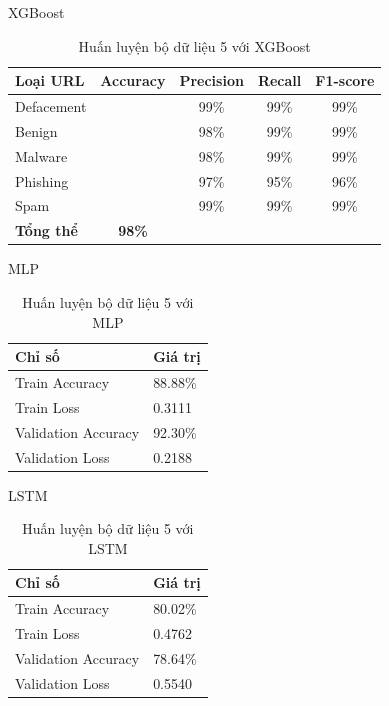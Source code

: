 \documentclass[13pt]{article}
\begin{document}
XGBoost
\newpage
\begin{table}[h]
    \centering
    \renewcommand{\arraystretch}{1.3} %
    \begin{tabular}{|l|c|c|c|c|}
        \hline
        \rowcolor[HTML]{C0C0C0} %
        \textbf{Loại URL} & \textbf{Accuracy} & \textbf{Precision} & \textbf{Recall} & \textbf{F1-score} \\ 
        \hline
        Defacement &  & 99\% & 99\% & 99\% \\ 
        \hline
        Benign &  & 98\% & 99\% & 99\% \\ 
        \hline
        Malware &  & 98\% & 99\% & 99\% \\ 
        \hline
        Phishing &  & 97\% & 95\% & 96\% \\ 
        \hline
        Spam &  & 99\% & 99\% & 99\% \\ 
        \hline
        \textbf{Tổng thể} & \textbf{98\%} &  &  &  \\ 
        \hline
    \end{tabular}
    \caption{Huấn luyện bộ dữ liệu 5 với XGBoost}
    \label{tab:logistic_regression}
\end{table}

MLP
\begin{table}[h]
    \centering
    \renewcommand{\arraystretch}{1.4} %
    \begin{tabular}{|p{5cm}|p{3cm}|}
        \hline
        \rowcolor[HTML]{C0C0C0} %
        \textbf{Chỉ số} & \textbf{Giá trị} \\ 
        \hline
        Train Accuracy & 88.88\% \\ 
        \hline
        Train Loss & 0.3111 \\ 
        \hline
        Validation Accuracy & 92.30\% \\ 
        \hline
        Validation Loss & 0.2188 \\ 
        \hline
    \end{tabular}
    \caption{Huấn luyện bộ dữ liệu 5 với MLP}
    \label{tab:mlp_training}
\end{table}

LSTM
\begin{table}[h]
    \centering
    \renewcommand{\arraystretch}{1.4} %
    \begin{tabular}{|p{5cm}|p{3cm}|}
        \hline
        \rowcolor[HTML]{C0C0C0} %
        \textbf{Chỉ số} & \textbf{Giá trị} \\ 
        \hline
        Train Accuracy & 80.02\% \\ 
        \hline
        Train Loss & 0.4762 \\ 
        \hline
        Validation Accuracy & 78.64\% \\ 
        \hline
        Validation Loss & 0.5540 \\ 
        \hline
    \end{tabular}
    \caption{Huấn luyện bộ dữ liệu 5 với LSTM}
    \label{tab:mlp_training}
\end{table}
\end{document}
